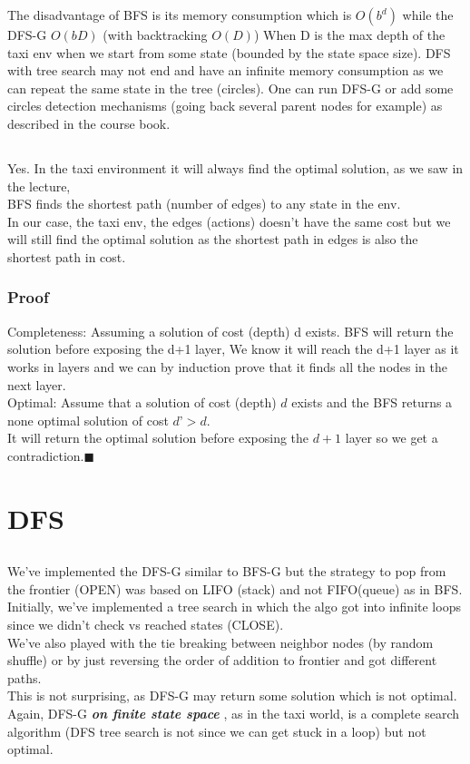 \documentclass[12pt]{article}
\newcommand{\qed}{\hfill$\blacksquare$}
\begin{document}
The disadvantage of BFS is its memory consumption which is $O(b^d)$ while the DFS-G $O(bD)$ (with backtracking $O(D)$) When D is the max depth of the taxi env when we start from some state (bounded by the state space size). DFS with tree search may not end and have an infinite memory consumption as we can repeat the same state in the tree (circles). One can run DFS-G or add some circles detection mechanisms (going back several parent nodes for example) as described in the course book.

\subsection{}
Yes. In the taxi environment it will always find the optimal solution, as we saw in the lecture,\\

BFS finds the shortest path (number of edges) to any state in the env.\\
In our case, the taxi env, the edges (actions) doesn't have the same cost but we will still find the optimal solution as the shortest path in edges is also the shortest path in cost.
\subsubsection*{Proof}
Completeness: Assuming a solution of cost (depth) d exists. BFS will return the solution before exposing the d+1 layer, We know it will reach the d+1 layer as it works in layers and we can by induction prove that it finds all the nodes in the next layer.\\
Optimal: Assume that a solution of cost (depth) $d$ exists and the BFS returns a none optimal solution of cost $d’ > d$.\\
It will return the optimal solution before exposing the $d+1$ layer so we get a contradiction.\qed

\section{DFS}

\subsection{}
We've implemented the DFS-G similar to BFS-G but the strategy to pop from the frontier (OPEN) was based on LIFO (stack) and not FIFO(queue) as in BFS.\\
Initially, we've implemented a tree search in which the algo got into infinite loops since we didn't check vs reached states (CLOSE).\\
We've also played with the tie breaking between neighbor nodes (by random shuffle) or by just reversing the order of addition to frontier and got different paths.\\
This is not surprising, as DFS-G may return some solution which is not optimal.
Again, DFS-G \textbf{\emph{on finite state space}} , as in the taxi world, is a complete search algorithm (DFS tree search is not since we can get stuck in a loop) but not optimal. 
\end{document}
